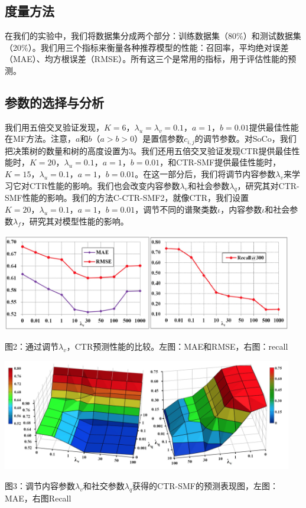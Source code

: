 \documentclass[10pt,a4paper]{article}
\theoremstyle{mythm}%
\numberwithin{equation}{section}
\begin{document}
\subsection{度量方法}
在我们的实验中，我们将数据集分成两个部分：训练数据集（80\%）和测试数据集（20\%）。我们用三个指标来衡量各种推荐模型的性能：召回率，平均绝对误差（MAE）、均方根误差（RMSE）。所有这三个是常用的指标，用于评估性能的预测。
\subsection{参数的选择与分析}
我们用五倍交叉验证发现，$K = 6，\lambda_u = \lambda_v = 0.1，a = 1，b = 0.01$提供最佳性能在MF方法。注意，$a$和$b$（$a>b>0$）是置信参数$c_{i,j}$的调节参数。对SoCo，我们把决策树的数量和树的高度设置为3。我们还用五倍交叉验证发现CTR提供最佳性能时，$K = 20，\lambda_u = 0.1，a = 1，b = 0.01$，和CTR-SMF提供最佳性能时，$K = 15，\lambda_u = 0.1，a = 1，b = 0.01$。在这一部分后，我们将调节内容参数$\lambda_v$来学习它对CTR性能的影响。我们也会改变内容参数$\lambda_v$和社会参数$\lambda_q$，研究其对CTR-SMF性能的影响。我们的方法C-CTR-SMF2，就像CTR，我们设置$K = 20，\lambda_u = 0.1，a = 1，b = 0.01$，调节不同的谱聚类数$\iota$，内容参数$\iota$和社会参数$\lambda_f$，研究其对模型性能的影响。

\includegraphics[width=5in]{figure2.png} 

图2：通过调节$\lambda_v$，CTR预测性能的比较。左图：MAE和RMSE，右图：recall

\includegraphics[width=5in]{figure3.png} 

图3：调节内容参数$\lambda_v$和社交参数$\lambda_q$获得的CTR-SMF的预测表现图，左图：MAE，右图Recall
\end{document}
